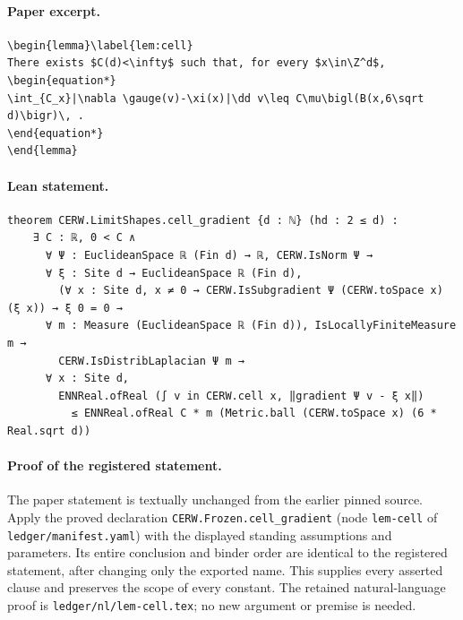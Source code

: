 \paragraph{Paper excerpt.}
\begin{verbatim}
\begin{lemma}\label{lem:cell}
There exists $C(d)<\infty$ such that, for every $x\in\Z^d$,
\begin{equation*}
\int_{C_x}|\nabla \gauge(v)-\xi(x)|\dd v\leq C\mu\bigl(B(x,6\sqrt d)\bigr)\, .
\end{equation*}
\end{lemma}
\end{verbatim}
\paragraph{Lean statement.}
\begin{verbatim}
theorem CERW.LimitShapes.cell_gradient {d : ℕ} (hd : 2 ≤ d) :
    ∃ C : ℝ, 0 < C ∧
      ∀ Ψ : EuclideanSpace ℝ (Fin d) → ℝ, CERW.IsNorm Ψ →
      ∀ ξ : Site d → EuclideanSpace ℝ (Fin d),
        (∀ x : Site d, x ≠ 0 → CERW.IsSubgradient Ψ (CERW.toSpace x) (ξ x)) → ξ 0 = 0 →
      ∀ m : Measure (EuclideanSpace ℝ (Fin d)), IsLocallyFiniteMeasure m →
        CERW.IsDistribLaplacian Ψ m →
      ∀ x : Site d,
        ENNReal.ofReal (∫ v in CERW.cell x, ‖gradient Ψ v - ξ x‖)
          ≤ ENNReal.ofReal C * m (Metric.ball (CERW.toSpace x) (6 * Real.sqrt d))
\end{verbatim}
\paragraph{Proof of the registered statement.}
The paper statement is textually unchanged from the earlier pinned source.
Apply the proved declaration \texttt{CERW.Frozen.cell\_gradient}
(node \texttt{lem-cell} of \texttt{ledger/manifest.yaml}) with the displayed
standing assumptions and parameters. Its entire conclusion and binder order
are identical to the registered statement, after changing only the exported
name. This supplies every asserted clause and preserves the scope of every
constant. The retained natural-language proof is
\texttt{ledger/nl/lem-cell.tex}; no new argument or premise is needed.
